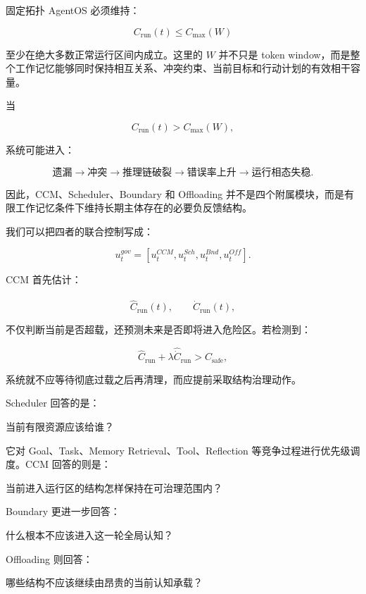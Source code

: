 固定拓扑 AgentOS 必须维持：

\[
\boxed{
C_{\mathrm{run}}(t)
\leq
C_{\max}(W)
}
\]

至少在绝大多数正常运行区间内成立。这里的 $W$ 并不只是 token window，而是整个工作记忆能够同时保持相互关系、冲突约束、当前目标和行动计划的有效相干容量。

当

\[
C_{\mathrm{run}}(t)
>
C_{\max}(W),
\]

系统可能进入：

\[
\text{遗漏}
\rightarrow
\text{冲突}
\rightarrow
\text{推理链破裂}
\rightarrow
\text{错误率上升}
\rightarrow
\text{运行相态失稳}.
\]

因此，CCM、Scheduler、Boundary 和 Offloading 并不是四个附属模块，而是有限工作记忆条件下维持长期主体存在的必要负反馈结构。

我们可以把四者的联合控制写成：

\[
u^{gov}_t
=
\left[
u^{CCM}_t,
u^{Sch}_t,
u^{Bnd}_t,
u^{Off}_t
\right].
\]

CCM 首先估计：

\[
\hat{C}_{\mathrm{run}}(t),
\qquad
\widehat{\dot C}_{\mathrm{run}}(t),
\]

不仅判断当前是否超载，还预测未来是否即将进入危险区。若检测到：

\[
\hat C_{\mathrm{run}}
+
\lambda
\widehat{\dot C}_{\mathrm{run}}
>
C_{\mathrm{safe}},
\]

系统就不应等待彻底过载之后再清理，而应提前采取结构治理动作。

Scheduler 回答的是：

\begin{statementbox}
当前有限资源应该给谁？
\end{statementbox}

它对 Goal、Task、Memory Retrieval、Tool、Reflection 等竞争过程进行优先级调度。CCM 回答的则是：

\begin{statementbox}
当前进入运行区的结构怎样保持在可治理范围内？
\end{statementbox}

Boundary 更进一步回答：

\begin{statementbox}
什么根本不应该进入这一轮全局认知？
\end{statementbox}

Offloading 则回答：

\begin{statementbox}
哪些结构不应该继续由昂贵的当前认知承载？
\end{statementbox}

